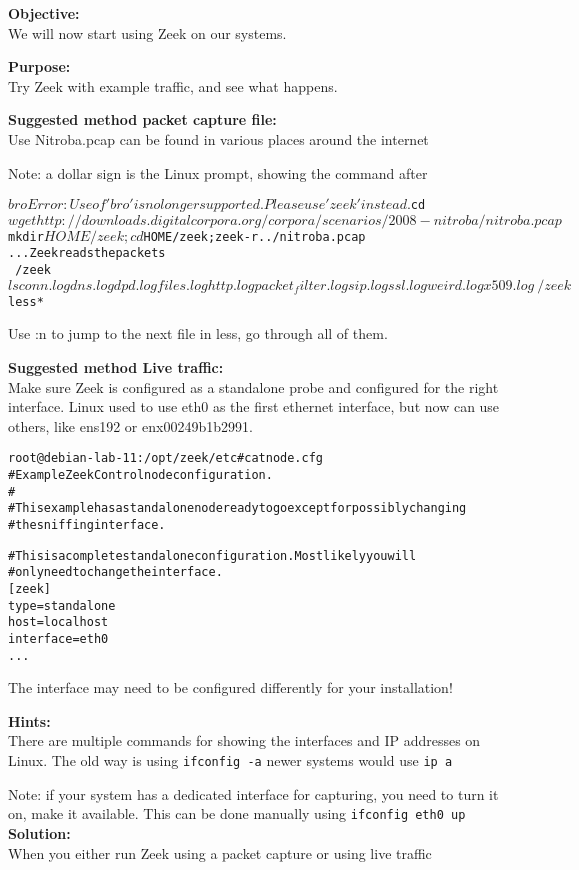\documentclass[a4paper,11pt,notitlepage]{report}
\begin{document}
{\bf Objective:} \\
We will now start using Zeek on our systems.


{\bf Purpose:}\\
Try Zeek with example traffic, and see what happens.


{\bf Suggested method packet capture file:}\\
Use Nitroba.pcap can be found in various places around the internet

Note: a dollar sign is the Linux prompt, showing the command after
\begin{alltt}\small
$ bro
Error: Use of 'bro' is no longer supported. Please use 'zeek' instead.
$ cd
$ wget http://downloads.digitalcorpora.org/corpora/scenarios/2008-nitroba/nitroba.pcap
$ mkdir $HOME/zeek;cd $HOME/zeek; zeek -r ../nitroba.pcap
... Zeek reads the packets
~/zeek$ ls
conn.log  dns.log  dpd.log  files.log  http.log  packet_filter.log
sip.log  ssl.log  weird.log  x509.log
~/zeek$ less *
\end{alltt}

Use :n to jump to the next file in less, go through all of them.


{\bf Suggested method Live traffic:}\\
Make sure Zeek is configured as a standalone probe and configured for the right interface. Linux used to use eth0 as the first ethernet interface, but now can use others, like ens192 or enx00249b1b2991.

\begin{alltt}
root@debian-lab-11:/opt/zeek/etc# cat node.cfg
# Example ZeekControl node configuration.
#
# This example has a standalone node ready to go except for possibly changing
# the sniffing interface.

# This is a complete standalone configuration.  Most likely you will
# only need to change the interface.
[zeek]
type=standalone
host=localhost
interface=eth0
...
\end{alltt}

The interface may need to be configured differently for your installation!

{\bf Hints:}\\
There are multiple commands for showing the interfaces and IP addresses on Linux. The old way is using \verb+ifconfig -a+ newer systems would use \verb+ip a+

Note: if your system has a dedicated interface for capturing, you need to turn it on, make it available. This can be done manually using \verb+ifconfig eth0 up+
{\bf Solution:}\\
When you either run Zeek using a packet capture or using live traffic
\end{document}
